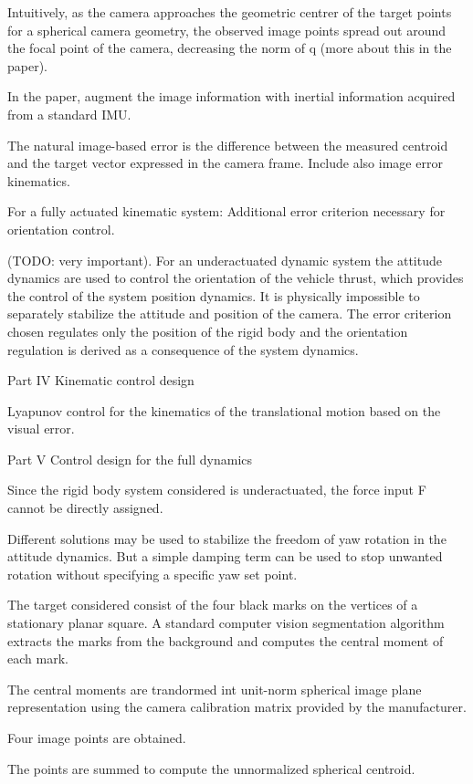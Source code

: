 Intuitively, as the camera approaches the geometric centrer of the target points for a spherical camera geometry, the observed image points spread out around the focal point of the camera, decreasing the norm of q (more about this in the paper).

In the paper, augment the image information with inertial information acquired from a standard IMU.

The natural image-based error is the difference between the measured centroid and the target vector expressed in the camera frame. Include also image error kinematics.

For a fully actuated kinematic system: Additional error criterion necessary for orientation control.
 
 (TODO: very important). For an underactuated dynamic system the attitude dynamics are used to control the orientation of the vehicle thrust, which provides the control of the system position dynamics.  It is physically impossible to separately stabilize the attitude and position of the camera. The error criterion chosen regulates only the position of the rigid body and the orientation regulation is derived as a consequence of the system dynamics.

Part IV Kinematic control design

Lyapunov control for the kinematics of the translational motion based on the visual error.

Part V Control design for the full dynamics

Since the rigid body system considered is underactuated, the force input F cannot be directly assigned.

Different solutions may be used to stabilize the freedom of yaw rotation in the attitude dynamics. But a simple damping term can be used to stop unwanted rotation without specifying a specific yaw set point.

The target considered consist of the four black marks on the vertices of a stationary planar square. A standard computer vision segmentation algorithm extracts the marks from the background and computes the central moment of each mark.

The central moments are trandormed int unit-norm spherical image plane representation using the camera calibration matrix provided by the manufacturer.

Four image points are obtained.

The points are summed to compute the unnormalized spherical centroid.


